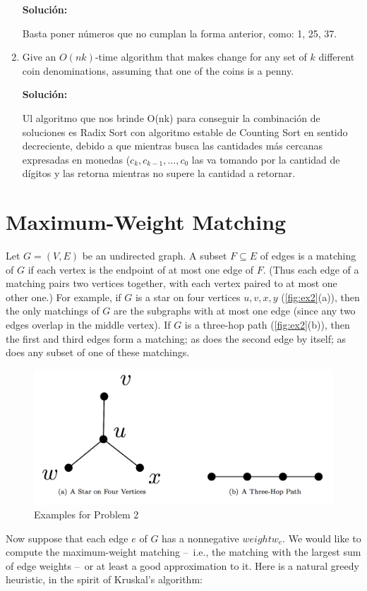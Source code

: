 \documentclass{article}
\begin{document}
\begin{enumerate}[label=(\alph*)]
  \textbf{Solución:}
  
  Basta poner números que no cumplan la forma anterior, como: 1, 25, 37.
  
  \item Give an $O(nk)$-time algorithm that makes change for any set of $k$ different coin denominations, assuming that one of the coins is a penny.
  
  \textbf{Solución:}
  
  Ul algoritmo que nos brinde O(nk) para conseguir la combinación de soluciones es Radix Sort con algoritmo estable de Counting Sort en sentido decreciente, debido a que mientras busca las cantidades más cercanas expresadas en monedas ($c_k, c_{k-1}, ..., c_0$ las va tomando por la cantidad de dígitos y las retorna mientras no supere la cantidad a retornar.
  
\end{enumerate}

\section{Maximum-Weight Matching}
Let $G = (V, E)$ be an undirected graph. A subset $F \subseteq E$ of edges is a matching of $G$ if each vertex is the endpoint of at most one edge of $F$.
(Thus each edge of a matching pairs two vertices together, with each vertex paired to at most one other one.) For example, if $G$ is a star on four vertices $u, v, x, y$ (\autoref{fig:ex2}(a)), then the only matchings of $G$ are
the subgraphs with at most one edge (since any two edges overlap in the middle vertex). If $G$ is a three-hop path (\autoref{fig:ex2}(b)), then the first and third edges form a matching; as does the second edge by itself; as does any subset of one of these matchings.

\begin{figure}[h]
  \centering
    \includegraphics[width=.7\textwidth]{ex12.png}
  \caption{Examples for Problem 2}
  \label{fig:ex2}
\end{figure}

Now suppose that each edge $e$ of $G$ has a nonnegative $weight w_e$. We would like to compute the maximum-weight matching \---\ i.e., the matching with the largest sum of edge weights \---\ or at least a good approximation to it. Here is a natural greedy heuristic, in the spirit of Kruskal's algorithm:
\end{document}
